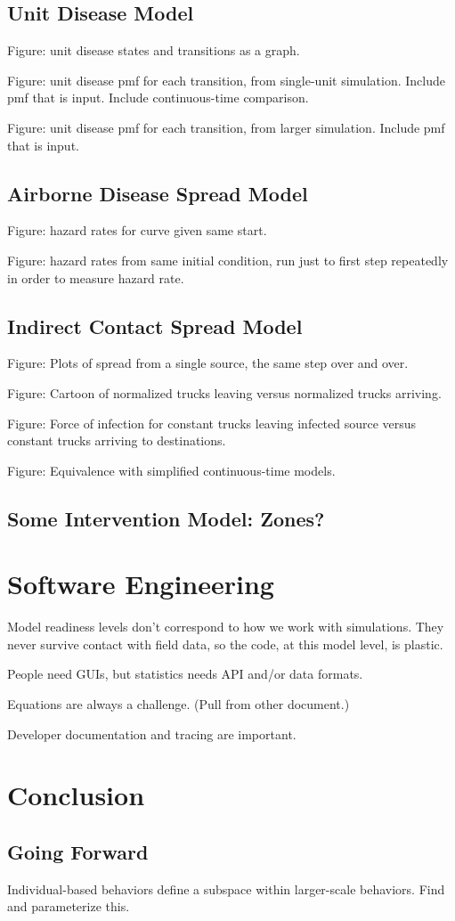 \documentclass{article}
\begin{document}
\subsection{Unit Disease Model}
Figure: unit disease states and transitions as a graph.

Figure: unit disease pmf for each transition, from single-unit simulation.
        Include pmf that is input. Include continuous-time comparison.

Figure: unit disease pmf for each transition, from larger simulation.
        Include pmf that is input.

\subsection{Airborne Disease Spread Model}
Figure: hazard rates for curve given same start.

Figure: hazard rates from same initial condition, run just to first step
        repeatedly in order to measure hazard rate.


\subsection{Indirect Contact Spread Model}
Figure: Plots of spread from a single source, the same step over and over.

Figure: Cartoon of normalized trucks leaving versus normalized
        trucks arriving.

Figure: Force of infection for constant trucks leaving infected source
        versus constant trucks arriving to destinations.

Figure: Equivalence with simplified continuous-time models.


\subsection{Some Intervention Model: Zones?}


\section{Software Engineering}
Model readiness levels don't correspond to how we work with
simulations. They never survive contact with field data,
so the code, at this model level, is plastic.

People need GUIs, but statistics needs API and/or data formats.

Equations are always a challenge. (Pull from other document.)

Developer documentation and tracing are important.

\section{Conclusion}
\subsection{Going Forward}
Individual-based behaviors define a subspace within larger-scale
behaviors. Find and parameterize this.
\end{document}
